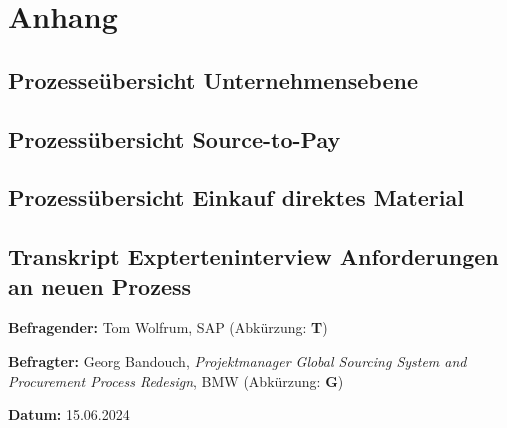 \chapter{Anhang}

\section{Prozesseübersicht Unternehmensebene} \label{sec:AnhangA1}

\begin{figure}
    
\end{figure}
\clearpage

\section{Prozessübersicht Source-to-Pay} \label{sec:AnhangA2}

\begin{figure}
    
\end{figure}
\clearpage

\section{Prozessübersicht Einkauf direktes Material} \label{sec:AnhangA3}

\begin{figure}
    
\end{figure}
\clearpage

\section{Transkript Expterteninterview Anforderungen an neuen Prozess} \label{sec:AnhangA4}

\textbf{Befragender:} Tom Wolfrum, SAP (Abkürzung: \textbf{T})

\textbf{Befragter:} Georg Bandouch, \textit{Projektmanager Global Sourcing System and Procurement Process Redesign}, BMW (Abkürzung: \textbf{G})

\textbf{Datum:} 15.06.2024

